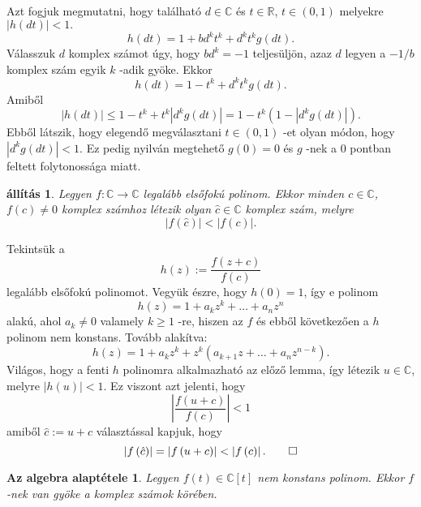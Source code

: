 \documentclass[9pt, a4paper, showtrims]{memoir}
\makeatletter
\renewenvironment{proof}[1][\proofname]
    {\par\pushQED{\qed}%
    \normalfont \topsep6\p@\@plus6\p@\relax
    \trivlist
    \item[\hskip\labelsep
        \itshape
    #1\@addpunct{:}]\ignorespaces}
    {\popQED\endtrivlist\@endpefalse}
\theoremstyle{plain}
\newtheorem{proposition}{állítás}[chapter]
\newtheorem*{FA}{Az algebra alaptétele}
\theoremstyle{remark}
\theoremstyle{definition}
\makeatother
\begin{document}
\begin{proof}
	Azt fogjuk megmutatni, hogy található $d\in \mathbb{C}$ és $t\in
		\mathbb{R}$, $t\in \left( 0,1\right) $ melyekre $\left| h\left( dt\right)
		\right| <1.$\[
		h\left( dt\right) =1+bd^{k}t^{k}+d^{k}t^{k}g\left( dt\right) .
	\]
	Válasszuk $d$ komplex számot úgy, hogy $bd^{k}=-1$ teljesüljön, azaz $d$ legyen a $-1/b$ komplex szám egyik $k$ -adik gyöke.
	Ekkor
	\[
		h\left( dt\right) =1-t^{k}+d^{k}t^{k}g\left( dt\right) .
	\]
	Amiből
	\[
		\left| h\left( dt\right) \right| \leq 1-t^{k}+t^{k}\left| d^{k}g\left(
		dt\right) \right| =1-t^{k}\left( 1-\left| d^{k}g\left( dt\right) \right|
		\right) .
	\]
	Ebből látszik, hogy elegendő megválasztani $t\in \left(
		0,1\right) $ -et olyan módon, hogy $\left| d^{k}g\left( dt\right)
		\right| <1.$ Ez pedig nyilván megtehető $g\left( 0\right) =0$ és
	$g$ -nek a $0$ pontban feltett folytonossága miatt.
\end{proof}

\begin{proposition}
	\label{Th:Cauchy2}Legyen $f:\mathbb{C}\rightarrow \mathbb{C}$ legalább elsőfokú polinom.
	Ekkor minden $c\in \mathbb{C}$, $f\left( c\right) \neq 0$
	komplex számhoz létezik olyan $\hat{c}\in \mathbb{C}$ komplex szám,
	melyre
	\[
		\left| f\left( \hat{c}\right) \right| <\left| f\left( c\right) \right| .
	\]
\end{proposition}

\begin{proof}
	Tekintsük a
	\[
		h\left( z\right) :=\frac{f\left( z+c\right) }{f\left( c\right) }
	\]
	legalább elsőfokú polinomot.
	Vegyük észre, hogy $h\left(
		0\right) =1$, így e polinom
	\[
		h\left( z\right) =1+a_{k}z^{k}+\ldots +a_{n}z^{n}
	\]
	alakú, ahol $a_{k}\neq 0$ valamely $k\geq 1$ -re, hiszen az $f$ és
	ebből következően a $h$ polinom nem konstans.
	Tovább alakítva:
	\[
		h\left( z\right) =1+a_{k}z^{k}+z^{k}\left( a_{k+1}z+\ldots
		+a_{n}z^{n-k}\right) .
	\]
	Világos, hogy a fenti $h$ polinomra alkalmazható az előző
	lemma, így létezik $u\in \mathbb{C}$, melyre $\left| h\left( u\right)
		\right| <1.$ Ez viszont azt jelenti, hogy
	\[
		\left| \frac{f\left( u+c\right) }{f\left( c\right) }\right| <1
	\]
	amiből $\hat{c}:=u+c$ választással kapjuk, hogy
	\[
		\left| f\left( \hat{c}\right) \right| =\left| f\left( u+c\right) \right|
		<\left| f\left( c\right) \right| .\qedhere
	\]
\end{proof}

\begin{FA}\label{Th:FundOfAlg}
	Legyen $f\left( t \right)\in\mathbb{C}[t]$ nem konstans polinom.
	Ekkor $f$-nek van gyöke a komplex számok körében.
\end{FA}
\end{document}
